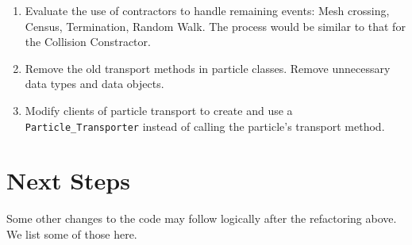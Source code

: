 \documentclass[memo]{ResearchNote}
\begin{document}
\begin{enumerate}
  \item Evaluate the use of contractors to handle remaining events:
    Mesh crossing, Census, Termination, Random Walk. The process would
    be similar to that for the Collision Constractor.
    
  \item Remove the old transport methods in particle classes. Remove
    unnecessary data types and data objects.
    
  \item Modify clients of particle transport to create and use a {\tt
      Particle\_Transporter} instead of calling the particle's
    transport method.

\end{enumerate}

\section{Next Steps}

Some other changes to the code may follow logically after the
refactoring above. We list some of those here.
\end{document}
